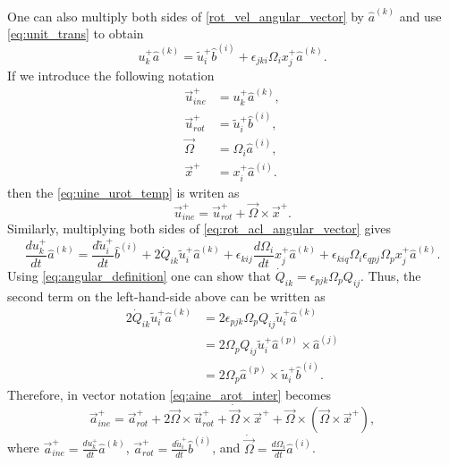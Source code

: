 \documentclass[oneside,a4paper,11pt]{report}
\begin{document}
One can also multiply both sides of \cref{rot_vel_angular_vector} by $\hat{a}^{(k)}$ and use \cref{eq:unit_trans} to obtain
\begin{equation}
    \label{eq:uine_urot_temp}
u^+_k \hat{a}^{(k)} = \tilde{u}^+_i \hat{b}^{(i)} + \epsilon_{jki}\Omega_ix^+_j \hat{a}^{(k)}.
\end{equation}
If we introduce the following notation
\begin{align}
    \vec{u}^+_{ine} &= u^+_k \hat{a}^{(k)}, \\
    \vec{u}^+_{rot} &= \tilde{u}^+_i \hat{b}^{(i)}, \\
    \vec{\Omega} &= \Omega_i \hat{a}^{(i)}, \\
    \vec{x}^+ &= x_i^+ \hat{a}^{(i)}.
\end{align}
then the \cref{eq:uine_urot_temp} is writen as 
\begin{equation}
\label{uine_urot}
\vec{u}^+_{ine}  = \vec{u}^+_{rot}  + \vec{\Omega} \times \vec{x}^+.
\end{equation}
Similarly, multiplying both sides of \cref{eq:rot_acl_angular_vector} gives
\begin{equation}
\label{eq:aine_arot_inter}
    \frac{du^+_k}{dt} \hat{a}^{(k)} = \frac{d\tilde{u}^+_i}{dt}\hat{b}^{(i)} + 2 \dot{Q}_{ik} \tilde{u}^+_i \hat{a}^{(k)} + \epsilon_{kij}\frac{d \Omega_{i}}{dt} x^+_j \hat{a}^{(k)} + \epsilon_{kiq}\Omega_{i} \epsilon_{qpj}\Omega_{p} x^+_j \hat{a}^{(k)}.
\end{equation}
Using \cref{eq:angular_definition} one can show that $\dot{Q}_{ik} = \epsilon_{pjk} \Omega_p Q_{ij}$. Thus, the second term on the left-hand-side above can be written as
\begin{align}
    2 \dot{Q}_{ik} \tilde{u}^+_i \hat{a}^{(k)} &= 2 \epsilon_{pjk} \Omega_p Q_{ij} \tilde{u}^+_i \hat{a}^{(k)} \nonumber \\
    &= 2 \Omega_p Q_{ij} \tilde{u}^+_i \hat{a}^{(p)} \times \hat{a}^{(j)} \nonumber \\
    &= 2 \Omega_p \hat{a}^{(p)} \times \tilde{u}^+_i \hat{b}^{(i)}.
\end{align}
Therefore, in vector notation \cref{eq:aine_arot_inter} becomes
\begin{equation}
    \label{eq:aine_arot}
    \vec{a}^+_{ine} = \vec{a}^+_{rot} + 2 \vec{\Omega} \times \vec{u}^+_{rot} + \dot{\vec{\Omega}} \times \vec{x}^+ + \vec{\Omega} \times (\vec{\Omega} \times \vec{x}^+),
\end{equation}
where $\vec{a}^+_{ine} = \frac{du^+_k}{dt} \hat{a}^{(k)}$, $\vec{a}^+_{rot} = \frac{d\tilde{u}^+_i}{dt}\hat{b}^{(i)}$, and $\dot{\vec{\Omega}} = \frac{d\Omega_i}{dt} \hat{a}^{(i)}$.
\end{document}

